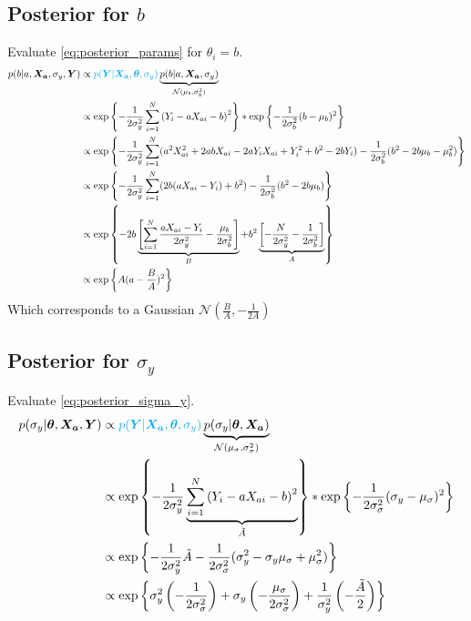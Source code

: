 \documentclass[10pt]{article}
\renewcommand{\vec}[1]{\boldsymbol{#1}}
\begin{document}
\subsection{Posterior for $b$}
Evaluate \cref{eq:posterior_params} for $\theta_i= b$.
\begin{align}
    p(b|a, \vec{X_a}, \sigma_y, \vec{Y}) &\propto {\color{cyan} p(\vec{Y} | \vec{X_a}, \vec{\theta}, \sigma_y)} \underbrace{p(b | a, \vec{X_a}, \sigma_{y})}_{\mathcal{N}(\mu_b, \sigma_b^2)} \\
    &\propto \exp\left\{ - \frac{1}{2\sigma_y^2} \sum_{i=1}^N \left( Y_i - a X_{ai} - b \right)^2 \right\} * \exp\left\{ - \frac{1}{2\sigma_b^2} ( b - \mu_b )^2 \right\} \\
    &\propto \exp\left\{ - \frac{1}{2\sigma_y^2} \sum_{i=1}^N (a^2 X_{ai}^2  + 2 a b X_{ai} - 2 a Y_i X_{ai} + Y_i^2 + b^2 -2 b Y_i )- \frac{1}{2\sigma_b^2} ( b^2 - 2 b \mu_b - \mu_b^2 ) \right\} \\
    &\propto \exp\left\{ - \frac{1}{2\sigma_y^2} \sum_{i=1}^N (2 b (a X_{ai} - Y_i) + b^2 ) - \frac{1}{2\sigma_b^2} ( b^2 - 2 b \mu_b ) \right\} \\
    &\propto \exp\left\{ - 2 b \underbrace{\left[ \sum_{i=1}^N \frac{a X_{ai} - Y_i}{2\sigma_y^2} - \frac{\mu_b}{2\sigma_b^2} \right]}_{B} + b^2 \underbrace{\left[ - \frac{N}{2\sigma_y^2}  - \frac{1}{2\sigma_b^2} \right]}_{A} \right\} \\
    &\propto \exp\left\{A (a - \frac{B}{A})^2\right\}
\end{align}
Which corresponds to a Gaussian $\mathcal{N}(\frac{B}{A}, -\frac{1}{2A})$


\subsection{Posterior for $\sigma_y$}
Evaluate \cref{eq:posterior_sigma_y}.
\begin{align}
    p(\sigma_y | \vec{\theta}, \vec{X_a}, \vec{Y}) &\propto {\color{cyan} p(\vec{Y} | \vec{X_a}, \vec{\theta}, \sigma_y)} \underbrace{p(\sigma_y | \vec{\theta}, \vec{X_a})}_{\mathcal{N}(\mu_{\sigma}, \sigma_{\sigma}^2)} \\
    &\propto \exp\left\{ - \frac{1}{2\sigma_y^2} \underbrace{\sum_{i=1}^N \left( Y_i - a X_{ai} - b \right)^2}_{\tilde{A}} \right\} * \exp\left\{ - \frac{1}{2\sigma_{\sigma}^2} ( \sigma_y - \mu_{\sigma} )^2 \right\} \\
    &\propto \exp\left\{ - \frac{1}{2\sigma_y^2} \tilde{A} - \frac{1}{2\sigma_{\sigma}^2} ( \sigma_y^2 - \sigma_y \mu_{\sigma} + \mu_{\sigma}^2 ) \right\} \\
    &\propto \exp\left\{ \sigma_y^2 \left( - \frac{1}{2\sigma_{\sigma}^2} \right) + \sigma_y \left( -  \frac{\mu_{\sigma}}{2\sigma_{\sigma}^2}\right) + \frac{1}{\sigma_y^2} \left( - \frac{\tilde{A}}{2} \right) \right\} 
\end{align}
\end{document}
